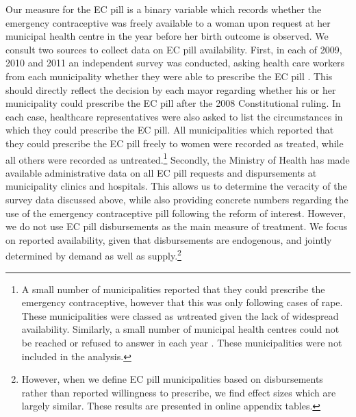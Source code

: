 Our measure for the EC pill is a binary variable which records whether the 
emergency contraceptive was freely available to a woman upon request at her 
municipal health centre in the year before her birth outcome is observed.  We
consult two sources to collect data on EC pill availability.  First, in each of 
2009, 2010 and 2011 an independent survey was conducted, asking health care 
workers from each municipality whether they were able to prescribe the EC pill
\citep{Didesetal2009,Didesetal2010,Didesetal2011}. This should 
directly reflect the decision by each mayor regarding whether his or her
municipality could prescribe the EC pill after the 2008 Constitutional ruling.  
In each case, healthcare representatives were also asked to list the circumstances 
in which they could prescribe the EC pill.  All municipalities which reported that
they could prescribe the EC pill freely to women were recorded as treated, while 
all others were recorded as untreated.\footnote{A small number of 
municipalities reported that they could prescribe the emergency contraceptive, 
however that this was only following cases of rape.  These municipalities were 
classed as \emph{un}treated given the lack of widespread availability.
Similarly, a small number of municipal health centres could not be reached
or refused to answer in each year \citep{Didesetal2009,Didesetal2010,
Didesetal2011}. These municipalities were not included in the analysis.}
Secondly, the Ministry of Health has made available administrative data on
all EC pill requests and dispursements at municipality clinics and hospitals.
This allows us to determine the veracity of the survey data discussed
above, while also providing concrete numbers regarding the use of the emergency 
contraceptive pill following the reform of interest.  However, we do not
use EC pill disbursements as the main measure of treatment.  We focus on
reported availability, given that disbursements are endogenous, and
jointly determined by demand as well as supply.\footnote{However, when we
define EC pill municipalities based on disbursements rather than reported
willingness to prescribe, we find effect sizes which are largely similar.
These results are presented in online appendix tables.}

